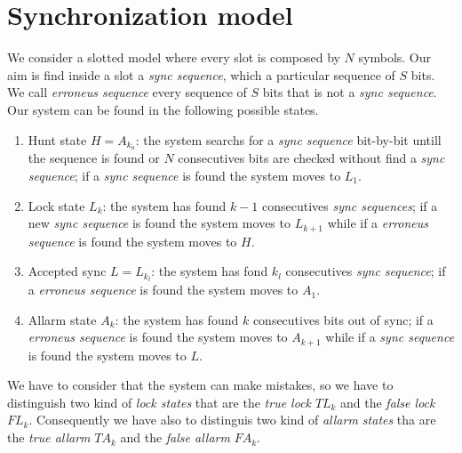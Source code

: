 \section{Synchronization model}
We consider a slotted model where every slot is composed by $N$ symbols. Our aim is find inside a slot a \textit{sync sequence}, which a particular sequence of $S$ bits. We call \textit{erroneus sequence} every sequence of $S$ bits that is not a \textit{sync sequence}.
Our system can be found in the following possible states.
\begin{enumerate}
	\item Hunt state $H=A_{k_a}$: the system searchs for a \textit{sync sequence} bit-by-bit untill the sequence is found or $N$ consecutives bits are checked without find a \textit{sync sequence}; if a \textit{sync sequence} is found the system moves to $L_1$.
	\item Lock state $L_k$: the system has found $k-1$ consecutives \textit{sync sequences}; if a new \textit{sync sequence} is found the system moves to $L_{k+1}$ while if a \textit{erroneus sequence} is found the system moves to $H$.
	\item Accepted sync $L=L_{k_l}$: the system has fond $k_l$ consecutives \textit{sync sequence}; if a \textit{erroneus sequence} is found the system moves to $A_1$.
	\item Allarm state $A_k$: the system has found $k$ consecutives bits out of sync; if a \textit{erroneus sequence} is found the system moves to $A_{k+1}$ while if a \textit{sync sequence} is found the system moves to $L$.
\end{enumerate}

We have to consider that the system can make mistakes, so we have to distinguish two kind of \textit{lock states} that are the \textit{true lock} $TL_k$ and the \textit{false lock} $FL_k$. Consequently we have also to distinguis two kind of \textit{allarm states} tha are the \textit{true allarm} $TA_k$ and the \textit{false allarm} $FA_k$.

